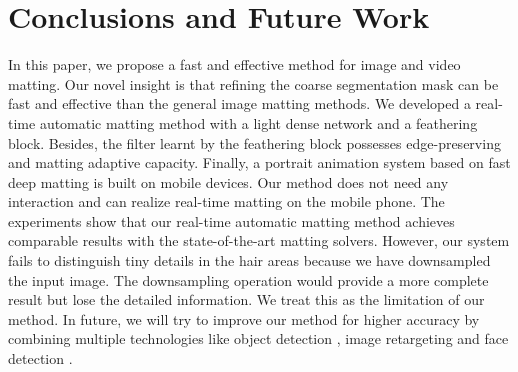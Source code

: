 \documentclass[sigconf]{acmart}
\begin{document}
\section{Conclusions and Future Work}
In this paper, we propose a fast and effective method for image and video matting. Our novel insight is that refining the coarse segmentation mask can be fast and effective than the general image matting methods. We developed a real-time automatic matting method with a light dense network and a feathering block. Besides, the filter learnt by the feathering block possesses edge-preserving and matting adaptive capacity. Finally, a portrait animation system based on fast deep matting is built on mobile devices. Our method does not need any interaction and can realize real-time matting on the mobile phone. The experiments show that our real-time automatic matting method achieves comparable results with the state-of-the-art matting solvers. However, our system fails to distinguish tiny details in the hair areas because we have downsampled the input image. The downsampling operation would provide a more complete result but lose the detailed information. We treat this as the limitation of our method. In future, we will try to improve our method for higher accuracy by combining multiple technologies like object detection \cite{Ren2015FasterRT,Chen2016AUM,Liu2016SSDSS,Redmon2016YOLO9000BF}, image retargeting \cite{Wang2016AdaptiveCC,Qi2016CASAIRCA} and face detection \cite{Schroff2015FaceNetAU,Qin2016JointTO,Hu2016FindingTF}.




\end{document}

